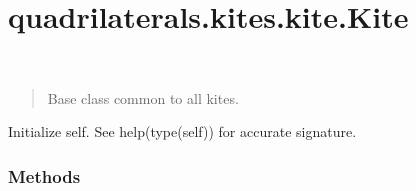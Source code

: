 \documentclass[letterpaper,10pt,english]{sphinxmanual}
\begin{document}
\section{quadrilaterals.kites.kite.Kite}
\label{\detokenize{_autosummary/quadrilaterals.kites.kite.Kite:quadrilaterals-kites-kite-kite}}\label{\detokenize{_autosummary/quadrilaterals.kites.kite.Kite::doc}}

\begin{fulllineitems}
\label{\detokenize{_autosummary/quadrilaterals.kites.kite.Kite:quadrilaterals.kites.kite.Kite}}~\begin{quote}

Base class common to all kites.
\end{quote}

\begin{sphinxVerbatim}[commandchars=\\\{\}]
    
\end{sphinxVerbatim}

\begin{fulllineitems}
\label{\detokenize{_autosummary/quadrilaterals.kites.kite.Kite:quadrilaterals.kites.kite.Kite.__init__}}
Initialize self.  See help(type(self)) for accurate signature.

\end{fulllineitems}

\subsubsection*{Methods}


\begin{savenotes}\sphinxatlongtablestart\begin{longtable}[c]{}
\hline


\end{longtable}
\end{savenotes}
\end{fulllineitems}
\end{document}
